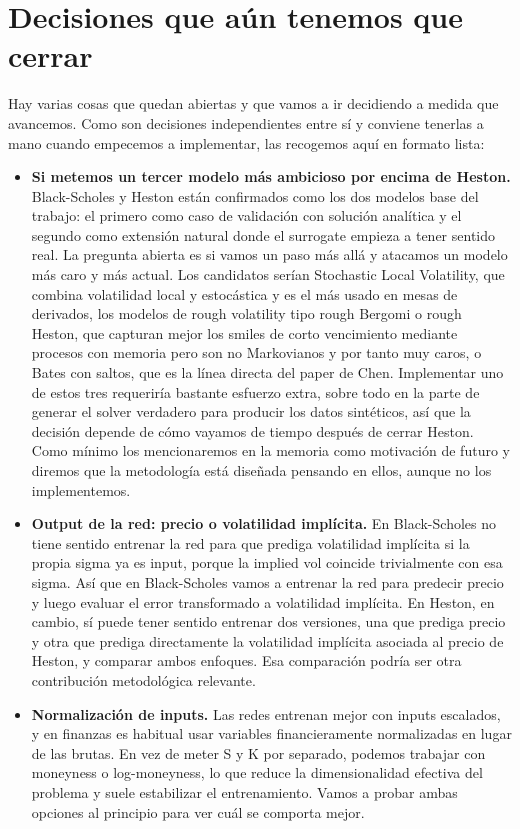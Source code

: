 \documentclass[11pt,a4paper]{article}
\begin{document}
\section*{Decisiones que aún tenemos que cerrar}

Hay varias cosas que quedan abiertas y que vamos a ir decidiendo a medida que avancemos. Como son decisiones independientes entre sí y conviene tenerlas a mano cuando empecemos a implementar, las recogemos aquí en formato lista:

\begin{itemize}
\item \textbf{Si metemos un tercer modelo más ambicioso por encima de Heston.} Black-Scholes y Heston están confirmados como los dos modelos base del trabajo: el primero como caso de validación con solución analítica y el segundo como extensión natural donde el surrogate empieza a tener sentido real. La pregunta abierta es si vamos un paso más allá y atacamos un modelo más caro y más actual. Los candidatos serían Stochastic Local Volatility, que combina volatilidad local y estocástica y es el más usado en mesas de derivados, los modelos de rough volatility tipo rough Bergomi o rough Heston, que capturan mejor los smiles de corto vencimiento mediante procesos con memoria pero son no Markovianos y por tanto muy caros, o Bates con saltos, que es la línea directa del paper de Chen. Implementar uno de estos tres requeriría bastante esfuerzo extra, sobre todo en la parte de generar el solver verdadero para producir los datos sintéticos, así que la decisión depende de cómo vayamos de tiempo después de cerrar Heston. Como mínimo los mencionaremos en la memoria como motivación de futuro y diremos que la metodología está diseñada pensando en ellos, aunque no los implementemos.

\item \textbf{Output de la red: precio o volatilidad implícita.} En Black-Scholes no tiene sentido entrenar la red para que prediga volatilidad implícita si la propia sigma ya es input, porque la implied vol coincide trivialmente con esa sigma. Así que en Black-Scholes vamos a entrenar la red para predecir precio y luego evaluar el error transformado a volatilidad implícita. En Heston, en cambio, sí puede tener sentido entrenar dos versiones, una que prediga precio y otra que prediga directamente la volatilidad implícita asociada al precio de Heston, y comparar ambos enfoques. Esa comparación podría ser otra contribución metodológica relevante.

\item \textbf{Normalización de inputs.} Las redes entrenan mejor con inputs escalados, y en finanzas es habitual usar variables financieramente normalizadas en lugar de las brutas. En vez de meter S y K por separado, podemos trabajar con moneyness o log-moneyness, lo que reduce la dimensionalidad efectiva del problema y suele estabilizar el entrenamiento. Vamos a probar ambas opciones al principio para ver cuál se comporta mejor.


\end{itemize}
\end{document}

